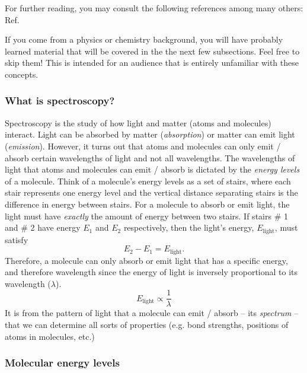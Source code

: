 \documentclass[12pt]{article}
\begin{document}
For further reading, you may consult the following references among many others: Ref.~\cite{quesadaFranckCondonFactorsCounting2019,wrightFranckCondonFactorsTheir1999,fantzFranckCondonFactors2006}

If you come from a physics or chemistry background, you will have probably learned material that will be covered in the the next few subsections. Feel free to skip them! This is intended for an audience that is entirely unfamiliar with these concepts.

\subsubsection{What is spectroscopy?}

Spectroscopy is the study of how light and matter (atoms and molecules) interact. 
Light can be absorbed by matter (\textit{absorption}) or matter can emit light (\textit{emission}). 
However, it turns out that atoms and molecules can only emit / absorb certain wavelengths of light and not all wavelengths. 
The wavelengths of light that atoms and molecules can emit / absorb is dictated by the \textit{energy levels} of a molecule.
Think of a molecule's energy levels as a set of stairs, where each stair represents one energy level and the vertical distance separating stairs is the difference in energy between stairs. 
For a molecule to absorb or emit light, the light must have \textit{exactly} the amount of energy between two stairs. 
If stairs \# 1 and \# 2 have energy $E_1$ and $E_2$ respectively, then the light's energy, $E_{\text{light}}$, must satisfy
\begin{equation}
    E_2 - E_1 = E_{\text{light}}.
\end{equation}
Therefore, a molecule can only absorb or emit light that has a specific energy, and therefore wavelength since the energy of light is inversely proportional to its wavelength ($\lambda$).
\begin{equation}
    E_{\text{light}} \propto \frac{1}{\lambda}
\end{equation}
It is from the pattern of light that a molecule can emit / absorb -- its \textit{spectrum} -- that we can determine all sorts of properties (e.g. bond strengths, positions of atoms in molecules, etc.)

\subsubsection{Molecular energy levels}
\end{document}
